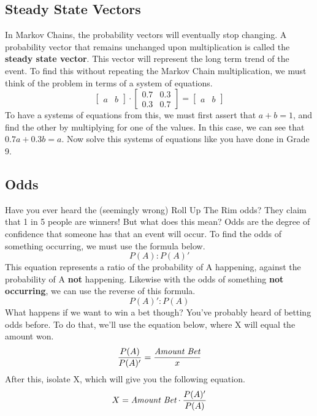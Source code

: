     \subsection{Steady State Vectors}
    In Markov Chains, the probability vectors will eventually stop changing.
    A probability vector that remains unchanged upon multiplication is called the \textbf{steady state vector}.
    This vector will represent the long term trend of the event.
    To find this without repeating the Markov Chain multiplication, we must think of the problem in terms of a system of equations.
    \begin{equation*}
        \begin{bmatrix}
            a & b
        \end{bmatrix}
        \cdot
        \begin{bmatrix}
            0.7 & 0.3\\
            0.3 & 0.7
        \end{bmatrix}
        =
        \begin{bmatrix}
            a & b
        \end{bmatrix}
    \end{equation*}
    To have a systems of equations from this, we must first assert that $a + b = 1$, and find the other by multiplying for one of the values.
    In this case, we can see that $0.7a + 0.3b = a$.
    Now solve this systems of equations like you have done in Grade 9.
    
    \subsection{Odds}
    Have you ever heard the (seemingly wrong) Roll Up The Rim odds?
    They claim that 1 in 5 people are winners!
    But what does this mean?
    Odds are the degree of confidence that someone has that an event will occur.
    To find the odds of something occurring, we must use the formula below.
    \begin{equation*}
        P(A) : P(A)' 
    \end{equation*}
    This equation represents a ratio of the probability of A happening, against the probability of A \textbf{not} happening. Likewise with the odds of something \textbf{not occurring}, we can use the reverse of this formula.
    \begin{equation*}
        P(A)' : P(A)
    \end{equation*}
    What happens if we want to win a bet though? You've probably heard of betting odds before. To do that, we'll use the equation below, where X will equal the amount won.
    \begin{equation*}
        \frac{P(A)}{P(A)'} = \frac{\emph{Amount Bet}}{x}
    \end{equation*}
    After this, isolate X, which will give you the following equation.
    \begin{equation*}
        X = \emph{Amount Bet}\cdot\frac{P(A)'}{P(A)}
    \end{equation*}